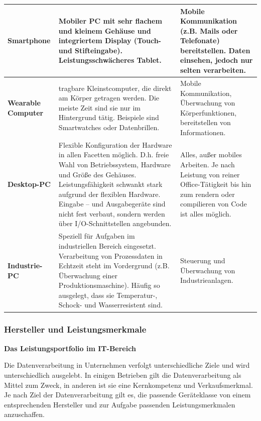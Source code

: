 \documentclass[10pt]{article}
\begin{document}
\begin{flushleft}
\begin{longtable}{|p{}|p{}|p{}|}
        \textbf{Smartphone} & Mobiler PC mit sehr flachem und kleinem Gehäuse und integriertem Display (Touch- und Stifteingabe). Leistungsschwächeres Tablet. & Mobile Kommunikation (z.B. Mails oder Telefonate) bereitstellen. Daten einsehen, jedoch nur selten verarbeiten. \\\hline

        \textbf{Wearable Computer} & tragbare Kleinstcomputer, die direkt am Körper getragen werden. Die meiste Zeit sind sie nur im Hintergrund tätig. Beispiele sind Smartwatches oder Datenbrillen. & Mobile Kommunikation, Überwachung von Körperfunktionen, bereitstellen von Informationen. \\\hline

        \textbf{Desktop-PC} & Flexible Konfiguration der Hardware in allen Facetten möglich. D.h. freie Wahl von Betriebssystem, Hardware und Größe des Gehäuses. \newline Leistungsfähigkeit schwankt stark aufgrund der flexiblen Hardware. \newline Eingabe – und Ausgabegeräte sind nicht fest verbaut, sondern werden über I/O-Schnittstellen angebunden. & Alles, außer mobiles Arbeiten. \newline Je nach Leistung von reiner Office-Tätigkeit bis hin zum rendern oder compilieren von Code ist alles möglich. \\\hline

        \textbf{Industrie-PC} & Speziell für Aufgaben im industriellen Bereich eingesetzt. Verarbeitung von Prozessdaten in Echtzeit steht im Vordergrund (z.B. Überwachung einer Produktionsmaschine). \newline Häufig so ausgelegt, dass sie Temperatur-, Schock- und Wasserresistent sind. & Steuerung und Überwachung von Industrieanlagen.

        \\\hline

\end{longtable}

\break

\subsubsection{Hersteller und Leistungsmerkmale}

\textbf{Das Leistungsportfolio im IT-Bereich}

Die Datenverarbeitung in Unternehmen verfolgt unterschiedliche Ziele und wird unterschiedlich ausgelebt. In einigen Betrieben gilt die Datenverarbeitung als Mittel zum Zweck, in anderen ist sie eine Kernkompetenz und Verkaufsmerkmal.
Je nach Ziel der Datenverarbeitung gilt es, die passende Geräteklasse von einem entsprechenden Hersteller und zur Aufgabe passenden Leistungsmerkmalen anzuschaffen.


\end{flushleft}
\end{document}
